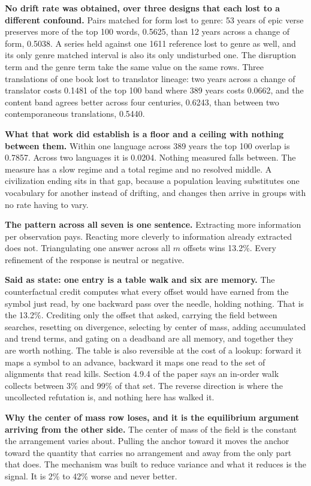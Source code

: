 \textbf{No drift rate was obtained, over three designs that each lost to a different confound.} Pairs matched for form lost to genre: 53 years of epic verse preserves more of the top 100 words, 0.5625, than 12 years across a change of form, 0.5038. A series held against one 1611 reference lost to genre as well, and its only genre matched interval is also its only undisturbed one. The disruption term and the genre term take the same value on the same rows. Three translations of one book lost to translator lineage: two years across a change of translator costs 0.1481 of the top 100 band where 389 years costs 0.0662, and the content band agrees better across four centuries, 0.6243, than between two contemporaneous translations, 0.5440.

\textbf{What that work did establish is a floor and a ceiling with nothing between them.} Within one language across 389 years the top 100 overlap is 0.7857. Across two languages it is 0.0204. Nothing measured falls between. The measure has a slow regime and a total regime and no resolved middle. A civilization ending sits in that gap, because a population leaving substitutes one vocabulary for another instead of drifting, and changes then arrive in groups with no rate having to vary.

\textbf{The pattern across all seven is one sentence.} Extracting more information per observation pays. Reacting more cleverly to information already extracted does not. Triangulating one answer across all \(m\) offsets wins 13.2\%. Every refinement of the response is neutral or negative.

\textbf{Said as state: one entry is a table walk and six are memory.} The counterfactual credit computes what every offset would have earned from the symbol just read, by one backward pass over the needle, holding nothing. That is the 13.2\%. Crediting only the offset that asked, carrying the field between searches, resetting on divergence, selecting by center of mass, adding accumulated and trend terms, and gating on a deadband are all memory, and together they are worth nothing. The table is also reversible at the cost of a lookup: forward it maps a symbol to an advance, backward it maps one read to the set of alignments that read kills. Section 4.9.4 of the paper says an in-order walk collects between 3\% and 99\% of that set. The reverse direction is where the uncollected refutation is, and nothing here has walked it.

\textbf{Why the center of mass row loses, and it is the equilibrium argument arriving from the other side.} The center of mass of the field is the constant the arrangement varies about. Pulling the anchor toward it moves the anchor toward the quantity that carries no arrangement and away from the only part that does. The mechanism was built to reduce variance and what it reduces is the signal. It is 2\% to 42\% worse and never better.

